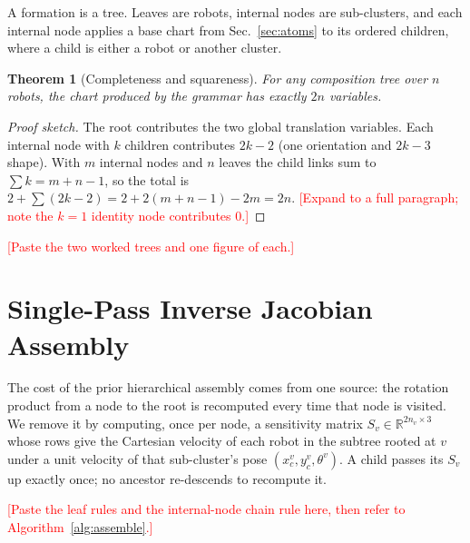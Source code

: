 \documentclass[conference]{IEEEtran}
\newtheorem{theorem}{Theorem}
\newcommand{\Sv}{S_v}
\newcommand{\fillnote}[1]{\textcolor{red}{[#1]}} %
\begin{document}
A formation is a tree. Leaves are robots, internal nodes are sub-clusters, and
each internal node applies a base chart from Sec.~\ref{sec:atoms} to its ordered
children, where a child is either a robot or another cluster.

\begin{theorem}[Completeness and squareness]
\label{thm:dim}
For any composition tree over $n$ robots, the chart produced by the grammar has
exactly $2n$ variables.
\end{theorem}
\begin{proof}[Proof sketch]
The root contributes the two global translation variables. Each internal node
with $k$ children contributes $2k-2$ (one orientation and $2k-3$ shape). With $m$
internal nodes and $n$ leaves the child links sum to $\sum k = m + n - 1$, so the
total is $2 + \sum (2k-2) = 2 + 2(m+n-1) - 2m = 2n$.
\fillnote{Expand to a full paragraph; note the $k=1$ identity node contributes $0$.}
\end{proof}

\fillnote{Paste the two worked trees and one figure of each.}

\section{Single-Pass Inverse Jacobian Assembly}
\label{sec:assembly}

The cost of the prior hierarchical assembly comes from one source: the rotation
product from a node to the root is recomputed every time that node is visited.
We remove it by computing, once per node, a sensitivity matrix
$\Sv \in \mathbb{R}^{2n_v \times 3}$ whose rows give the Cartesian velocity of each
robot in the subtree rooted at $v$ under a unit velocity of that sub-cluster's
pose $(x_c^v, y_c^v, \theta^v)$. A child passes its $\Sv$ up exactly once; no
ancestor re-descends to recompute it.

\fillnote{Paste the leaf rules and the internal-node chain rule here, then refer
to Algorithm~\ref{alg:assemble}.}
\end{document}
